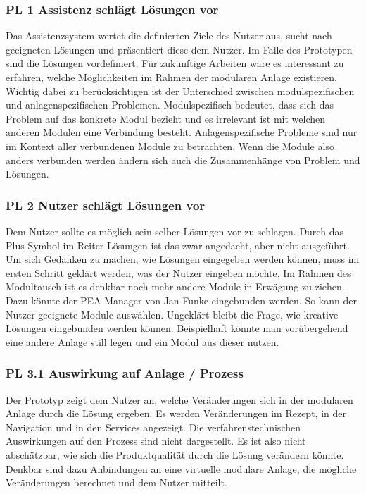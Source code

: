 \subsubsection*{PL 1 Assistenz schlägt Lösungen vor}
Das Assistenzsystem wertet die definierten Ziele des Nutzer aus, sucht nach geeigneten Lösungen und präsentiert diese dem Nutzer. Im Falle des Prototypen sind die Lösungen vordefiniert. Für zukünftige Arbeiten wäre es interessant zu erfahren, welche Möglichkeiten im Rahmen der modularen Anlage existieren. Wichtig dabei zu berücksichtigen ist der Unterschied zwischen modulspezifischen und anlagenspezifischen Problemen. Modulspezifisch bedeutet, dass sich das Problem auf das konkrete Modul bezieht und es irrelevant ist mit welchen anderen Modulen eine Verbindung besteht. Anlagenspezifische Probleme sind nur im Kontext aller verbundenen Module zu betrachten. Wenn die Module also anders verbunden werden ändern sich auch die Zusammenhänge von Problem und Lösungen.

\subsubsection*{PL 2 Nutzer schlägt Lösungen vor}
Dem Nutzer sollte es möglich sein selber Lösungen vor zu schlagen. Durch das Plus-Symbol im Reiter Lösungen ist das zwar angedacht, aber nicht ausgeführt. Um sich Gedanken zu machen, wie Lösungen eingegeben werden können, muss im ersten Schritt geklärt werden, was der Nutzer eingeben möchte. Im Rahmen des Modultausch ist es denkbar noch mehr andere Module in Erwägung zu ziehen. Dazu könnte der PEA-Manager von Jan Funke \cite{Funke2018} eingebunden werden. So kann der Nutzer geeignete Module auswählen. Ungeklärt bleibt die Frage, wie kreative Lösungen eingebunden werden können. Beispielhaft könnte man vorübergehend eine andere Anlage still legen und ein Modul aus dieser nutzen.

\subsubsection*{PL 3.1 Auswirkung auf Anlage / Prozess}
Der Prototyp zeigt dem Nutzer an, welche Veränderungen sich in der modularen Anlage durch die Lösung ergeben. Es werden Veränderungen im Rezept, in der Navigation und in den Services angezeigt. Die verfahrenstechnischen Auswirkungen auf den Prozess sind nicht dargestellt. Es ist also nicht abschätzbar, wie sich die Produktqualität durch die Lösung verändern könnte. Denkbar sind dazu Anbindungen an eine virtuelle modulare Anlage, die mögliche Veränderungen berechnet und dem Nutzer mitteilt.

